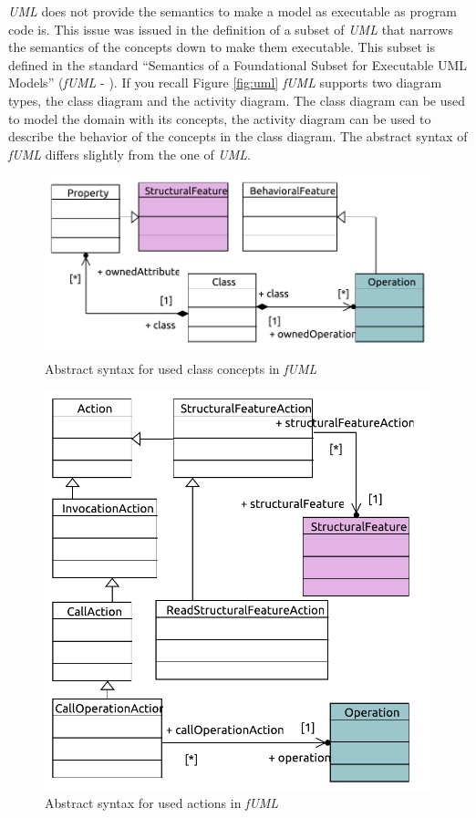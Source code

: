 \documentclass{llncs}
\begin{document}
\textit{UML} does not provide the semantics to make a model as executable as program code is. This issue was issued in the definition of a subset of \textit{UML} that narrows the semantics of the concepts down to make them executable. This subset is defined in the standard ``Semantics of a Foundational Subset for Executable UML Models'' (\textit{fUML} - \cite{man:FUML}). If you recall Figure \ref{fig:uml} \textit{fUML} supports two diagram types, the class diagram and the activity diagram. The class diagram can be used to model the domain with its concepts, the activity diagram can be used to describe the behavior of the concepts in the class diagram. The abstract syntax of \textit{fUML} differs slightly from the one of \textit{UML}.

\begin{figure}[h!t]
 \centering
 \includegraphics[scale=0.8]{images/fuml1}
 \caption{Abstract syntax for used class concepts in \textit{fUML}}
 \label{fig:fuml1}
\end{figure}

\begin{figure}[h!t]
 \centering
 \includegraphics[scale=0.8]{images/fuml2}
 \caption{Abstract syntax for used actions in \textit{fUML}}
 \label{fig:fuml2}
\end{figure}
\end{document}
